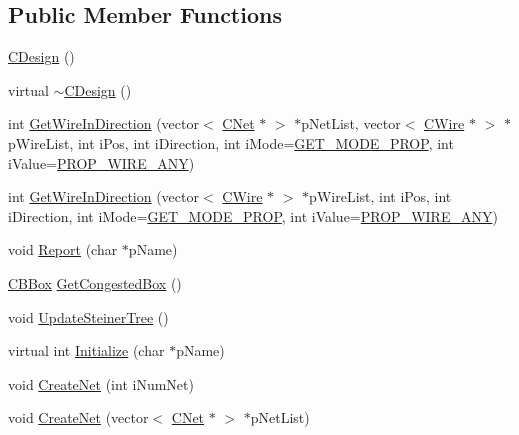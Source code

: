 \subsection*{Public Member Functions}
\begin{DoxyCompactItemize}
\item 
\mbox{\hyperlink{classCDesign_a87d140d2c8dbaa85b77f41d7724cc309}{C\+Design}} ()
\item 
virtual \mbox{\hyperlink{classCDesign_a230641b0a13390b934de6ff40b869e01}{$\sim$\+C\+Design}} ()
\item 
int \mbox{\hyperlink{classCDesign_a0b7936130fc4fb79009bfaf1df97e76e}{Get\+Wire\+In\+Direction}} (vector$<$ \mbox{\hyperlink{classCNet}{C\+Net}} $\ast$ $>$ $\ast$p\+Net\+List, vector$<$ \mbox{\hyperlink{classCWire}{C\+Wire}} $\ast$ $>$ $\ast$p\+Wire\+List, int i\+Pos, int i\+Direction, int i\+Mode=\mbox{\hyperlink{BoxRouter_8h_a678c4c2628bee05b15999bb00ded44d3}{G\+E\+T\+\_\+\+M\+O\+D\+E\+\_\+\+P\+R\+OP}}, int i\+Value=\mbox{\hyperlink{BoxRouter_8h_a3190814b5494277cd30ff3d03c8d4058}{P\+R\+O\+P\+\_\+\+W\+I\+R\+E\+\_\+\+A\+NY}})
\item 
int \mbox{\hyperlink{classCDesign_a569c1b0aa4defe50ebb89a5a4054631c}{Get\+Wire\+In\+Direction}} (vector$<$ \mbox{\hyperlink{classCWire}{C\+Wire}} $\ast$ $>$ $\ast$p\+Wire\+List, int i\+Pos, int i\+Direction, int i\+Mode=\mbox{\hyperlink{BoxRouter_8h_a678c4c2628bee05b15999bb00ded44d3}{G\+E\+T\+\_\+\+M\+O\+D\+E\+\_\+\+P\+R\+OP}}, int i\+Value=\mbox{\hyperlink{BoxRouter_8h_a3190814b5494277cd30ff3d03c8d4058}{P\+R\+O\+P\+\_\+\+W\+I\+R\+E\+\_\+\+A\+NY}})
\item 
void \mbox{\hyperlink{classCDesign_a0cbed390d0e0c05776aed59c16f7982c}{Report}} (char $\ast$p\+Name)
\item 
\mbox{\hyperlink{classCBBox}{C\+B\+Box}} \mbox{\hyperlink{classCDesign_a0ea51597e843c1f8f25dbfa4f4d4fa17}{Get\+Congested\+Box}} ()
\item 
void \mbox{\hyperlink{classCDesign_a9571bf3353ab819782f0162867e525dc}{Update\+Steiner\+Tree}} ()
\item 
virtual int \mbox{\hyperlink{classCDesign_a9a2909717e3b6947c6d685e13088be6d}{Initialize}} (char $\ast$p\+Name)
\item 
void \mbox{\hyperlink{classCDesign_a844b18267aad1895dc66e3208b36d21b}{Create\+Net}} (int i\+Num\+Net)
\item 
void \mbox{\hyperlink{classCDesign_a961dbd6912b3ef52ff673b60342f51a6}{Create\+Net}} (vector$<$ \mbox{\hyperlink{classCNet}{C\+Net}} $\ast$ $>$ $\ast$p\+Net\+List)
\item 

\end{DoxyCompactItemize}
